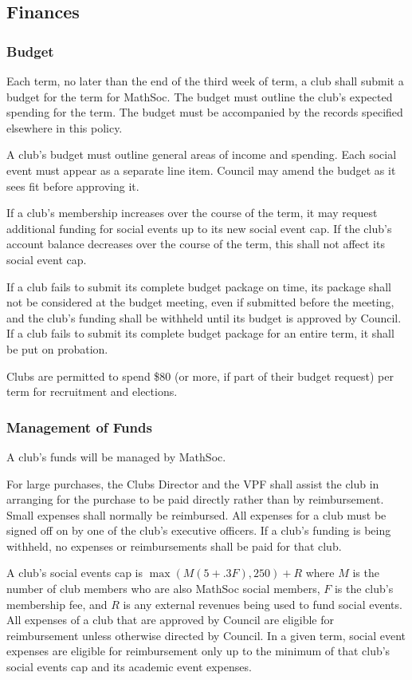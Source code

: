 \subsection{Finances}
\subsubsection{Budget}
Each term, no later than the end of the third week of term, a club shall submit
a budget for the term for MathSoc. The budget must outline the club's expected
spending for the term. The budget must be accompanied by the records specified
elsewhere in this policy.

A club's budget must outline general areas of income and spending. Each social
event must appear as a separate line item. Council may amend the budget as it
sees fit before approving it.

If a club's membership increases over the course of the term, it may request
additional funding for social events up to its new social event cap. If the
club's account balance decreases over the course of the term, this shall not
affect its social event cap.

If a club fails to submit its complete budget package on time, its package shall
not be considered at the budget meeting, even if submitted before the meeting,
and the club's funding shall be withheld until its budget is approved by
Council. If a club fails to submit its complete budget package for an entire
term, it shall be put on probation.

Clubs are permitted to spend \$80 (or more, if part of their budget request) per
term for recruitment and elections.

\subsubsection{Management of Funds}
A club's funds will be managed by MathSoc.

For large purchases, the Clubs Director and the VPF shall assist the club in
arranging for the purchase to be paid directly rather than by reimbursement.
Small expenses shall normally be reimbursed.  All expenses for a club must be
signed off on by one of the club's executive officers. If a club's funding is
being withheld, no expenses or reimbursements shall be paid for that club.

A club's social events cap is $\max(M(5 + .3F), 250) + R$ where $M$ is the
number of club members who are also MathSoc social members, $F$ is the
club's membership fee, and $R$ is any external revenues being used to fund social events. All expenses of a club that are approved by Council are
eligible for reimbursement unless otherwise directed by Council. In a given
term, social event expenses are eligible for reimbursement only up to the
minimum of that club's social events cap and its academic event expenses.


